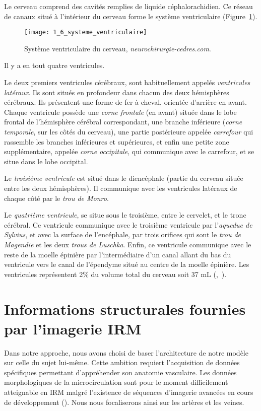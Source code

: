 Le cerveau comprend des cavités remplies de liquide céphalorachidien. Ce réseau de canaux situé à l’intérieur du cerveau forme le système ventriculaire (Figure~\ref{fig:1_6_systeme_ventriculaire}).
\begin{figure}[!t]
\centering
\texttt{[image: 1\_6\_systeme\_ventriculaire]}
\caption{Système ventriculaire du cerveau,  {\em neurochirurgie-cedres.com}. }
\label{fig:1_6_systeme_ventriculaire}	
\end{figure}
Il y a en tout quatre ventricules.

Le deux premiers ventricules cérébraux, sont habituellement appelés {\em ventricules latéraux}. Ils sont situés en profondeur dans chacun des deux hémisphères cérébraux. Ils présentent une forme de fer à cheval, orientée d'arrière en avant. Chaque ventricule possède une {\em corne frontale} (en avant) située dans le lobe frontal de l'hémisphère cérébral correspondant, une branche inférieure ({\em corne temporale}, sur les côtés du cerveau), une partie postérieure appelée {\em carrefour} qui rassemble les branches inférieures et supérieures, et enfin une petite zone supplémentaire, appelée {\em corne occipitale}, qui communique avec le carrefour, et se situe dans le lobe occipital.

Le {\em troisième ventricule} est situé dans le diencéphale (partie du cerveau située entre les deux hémisphères). Il communique avec les ventricules latéraux de chaque côté par le {\em trou de Monro}.

Le {\em quatrième ventricule}, se situe sous le troisième, entre le cervelet, et le tronc cérébral. Ce ventricule communique avec le troisième ventricule par l'{\em aqueduc de Sylvius}, et avec la surface de l'encéphale, par trois orifices qui sont le {\em trou de Magendie} et les deux {\em trous de Luschka}. Enfin, ce ventricule communique avec le reste de la moelle épinière par l'intermédiaire d'un canal allant du bas du ventricule vers le canal de l'épendyme situé au centre de la moelle épinière.
Les ventricules représentent 2\% du volume total du cerveau soit 37 mL (\cite{Akdogan2010},~\cite{Ott2010}).
\section{Informations structurales fournies par l'imagerie IRM}
Dans notre approche, nous avons choisi de baser l’architecture de notre modèle sur celle du sujet lui-même. Cette ambition requiert l’acquisition de données spécifiques permettant d’appréhender son anatomie vasculaire. Les données morphologiques de la microcirculation sont pour le moment difficilement atteignable en IRM malgré l'existence de séquences d'imagerie avancées en cours de développement (\cite{Ashoor2006}). Nous nous focaliserons ainsi sur les artères et les veines.

